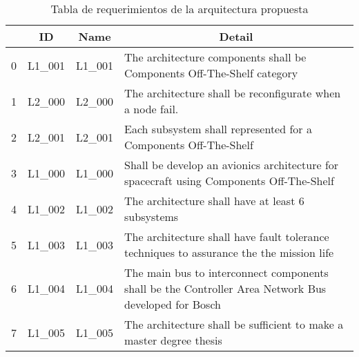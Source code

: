 \begin{sidewaystable}[]
  \small
\centering
\caption{Tabla de requerimientos de la arquitectura propuesta}
\label{table:Requerimientos}
\begin{tabular}{|l|l|l|l|}
\hline
\multicolumn{1}{|c|}{\textbf{}} & \multicolumn{1}{c|}{\textbf{ID}} & \multicolumn{1}{c|}{\textbf{Name}} & \multicolumn{1}{c|}{\textbf{Detail}}                                                                           \\ \hline
0                               & L1\_001                          & L1\_001                            & The architecture components shall be Components Off-The-Shelf category                                         \\ \hline
1                               & L2\_000                          & L2\_000                            & The architecture shall be reconfigurate when a node fail.                                                      \\ \hline
2                               & L2\_001                          & L2\_001                            & Each subsystem shall represented for a Components Off-The-Shelf                                                \\ \hline
3                               & L1\_000                          & L1\_000                            & Shall be develop an avionics architecture for spacecraft using Components Off-The-Shelf                        \\ \hline
4                               & L1\_002                          & L1\_002                            & The architecture shall have at least 6 subsystems                                                              \\ \hline
5                               & L1\_003                          & L1\_003                            & The architecture shall have fault tolerance techniques to assurance the the mission life                       \\ \hline
6                               & L1\_004                          & L1\_004                            & The main bus to interconnect components shall be the Controller Area Network Bus developed for Bosch           \\ \hline
7                               & L1\_005                          & L1\_005                            & The architecture shall be sufficient to make a master degree thesis                                            \\ \hline

\end{tabular}
\end{sidewaystable}
